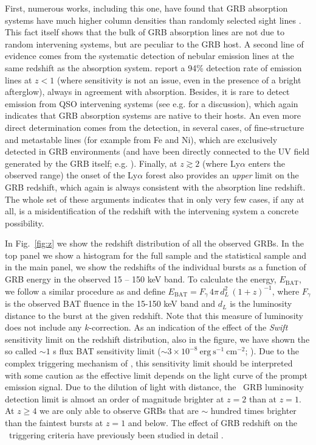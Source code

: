 \documentclass[longauth]{aa}    %
\begin{document}
First, numerous works, including this one, have found that GRB absorption
systems have much higher column densities than randomly selected sight lines
\citep{2001ApJ...549L.209G, Savaglio2003,  Prochaska2007, Fynbo2009}. This fact
itself shows that the bulk of GRB absorption lines are not due to random
intervening systems, but are peculiar to the GRB host. A second line of evidence
comes from the systematic detection of nebular emission lines at the same
redshift as the absorption system. \citet{Kruhler2015} report a 94\% detection
rate of emission lines at $z < 1$ (where sensitivity is not an issue, even in
the presence of a bright afterglow), always in agreement with absorption.
Besides, it is rare to detect emission from QSO intervening systems
(see e.g. \citealt{2010MNRAS.408.2128F} for a discussion), which again indicates
that GRB absorption systems are native to their hosts. An even more direct
determination comes from the detection, in several cases, of fine-structure and
metastable lines (for example from Fe and Ni), which are exclusively detected in
GRB environments (and have been directly connected to the UV field generated by
the GRB itself; e.g. \citealt{2006ApJ...648...95P, Vreeswijk2007, DElia2009}).
Finally, at $z \gtrsim 2$ (where Ly$\alpha$ enters the observed range) the onset
of the Ly$\alpha$ forest also provides an \textit{upper} limit on the GRB
redshift, which again is always consistent with the absorption line redshift.
The whole set of these arguments indicates that in only very few cases, if any
at all, is a misidentification of the redshift with the intervening system a
concrete possibility.




In Fig.~\ref{fig:z} we show the redshift distribution of all  the observed GRBs.
In the top panel we show a histogram for the full sample and the statistical
sample and in the main panel, we show the redshifts of the individual bursts as
a function of GRB energy in the observed 15 -- 150 keV band. To calculate the
energy, $E_{\mathrm{BAT}}$, we follow a similar procedure as \citet{Lien2016}
and define $E_{\mathrm{BAT}} = F_{\gamma}\,4 \pi\,d_L^2\,(1+z)^{-1}$, where
$F_{\gamma}$ is the observed BAT fluence in the 15-150 keV band and $d_L$ is the
luminosity distance to the burst at the given redshift. Note that this measure
of luminosity does not include any $k$-correction. As an indication of the
effect of the \textit{Swift} sensitivity limit on the redshift distribution,
also in the figure, we have shown the so called $\sim 1$ s flux BAT sensitivity
limit ($\sim 3 \times 10^{-8}~\mathrm{erg}~\mathrm{s}^{-1}~\mathrm{cm}^{-2}$;
\citealt{Baumgartner2013, Lien2016}). Due to the complex triggering mechanism of
\swift, this sensitivity limit should be interpreted with some caution as the
effective limit depends on the light curve of the prompt emission signal. Due to
the dilution of light with distance, the \swift~GRB luminosity detection limit
is almost an order of magnitude brighter at $z=2$ than at $z=1$. At $z\geq4$ we
are only able to observe GRBs that are $\sim$ hundred times brighter than the
faintest bursts at $z=1$ and below. The effect of GRB redshift on the
\swift~triggering criteria have previously been studied in detail
\citep{Littlejohns2013a}.
\end{document}
